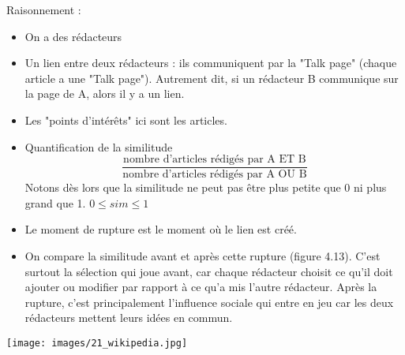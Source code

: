 Raisonnement :
\begin{itemize}
\item On a des rédacteurs
\item Un lien entre deux rédacteurs : ils communiquent par la "Talk page" (chaque article a une "Talk page"). Autrement dit, si un rédacteur B communique sur la page de A, alors il y a un lien.
\item Les "points d'intérêts" ici sont les articles.
\item Quantification de la similitude
	$$\displaystyle\frac{\mbox{nombre d'articles rédigés par A ET B}}{\mbox{nombre d'articles rédigés par A OU B}}$$
Notons dès lors que la similitude ne peut pas être plus petite que 0 ni plus grand que 1. $0 \leq sim \leq 1$
\item Le moment de rupture est le moment où le lien est créé.
\item On compare la similitude avant et après cette rupture (figure 4.13). C'est surtout la sélection qui joue avant, car chaque rédacteur choisit ce qu'il doit ajouter ou modifier par rapport à ce qu'a mis l'autre rédacteur. Après la rupture, c'est principalement l'influence sociale qui entre en jeu car les deux rédacteurs mettent leurs idées en commun. %
\end{itemize}

\texttt{[image: images/21\_wikipedia.jpg]}
